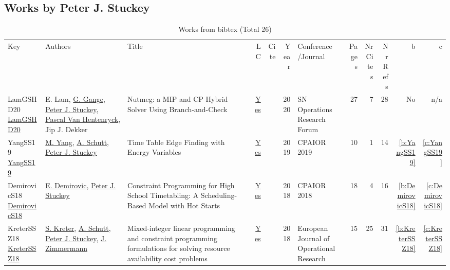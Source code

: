 \subsection{Works by Peter J. Stuckey}
\label{sec:a126}
{\scriptsize
\begin{longtable}{>{\raggedright\arraybackslash}p{3cm}>{\raggedright\arraybackslash}p{6cm}>{\raggedright\arraybackslash}p{6.5cm}rrrp{2.5cm}rrrrr}
\rowcolor{white}\caption{Works from bibtex (Total 26)}\\ \toprule
\rowcolor{white}Key & Authors & Title & LC & Cite & Year & \shortstack{Conference\\/Journal} & Pages & \shortstack{Nr\\Cites} & \shortstack{Nr\\Refs} & b & c \\ \midrule\endhead
\bottomrule
\endfoot
LamGSHD20 \href{http://dx.doi.org/10.1007/s43069-020-00023-2}{LamGSHD20} & E. Lam, \hyperref[auth:a187]{G. Gange}, \hyperref[auth:a126]{Peter J. Stuckey}, \hyperref[auth:a149]{Pascal Van Hentenryck}, Jip J. Dekker & Nutmeg: a MIP and CP Hybrid Solver Using Branch-and-Check & \href{works/LamGSHD20.pdf}{Yes} & \cite{LamGSHD20} & 2020 & SN Operations Research Forum & 27 & 7 & 28 & No & n/a\\
YangSS19 \href{https://doi.org/10.1007/978-3-030-19212-9\_42}{YangSS19} & \hyperref[auth:a312]{M. Yang}, \hyperref[auth:a125]{A. Schutt}, \hyperref[auth:a126]{Peter J. Stuckey} & Time Table Edge Finding with Energy Variables & \href{works/YangSS19.pdf}{Yes} & \cite{YangSS19} & 2019 & CPAIOR 2019 & 10 & 1 & 14 & \ref{b:YangSS19} & \ref{c:YangSS19}\\
DemirovicS18 \href{https://doi.org/10.1007/978-3-319-93031-2\_10}{DemirovicS18} & \hyperref[auth:a315]{E. Demirovic}, \hyperref[auth:a126]{Peter J. Stuckey} & Constraint Programming for High School Timetabling: {A} Scheduling-Based Model with Hot Starts & \href{works/DemirovicS18.pdf}{Yes} & \cite{DemirovicS18} & 2018 & CPAIOR 2018 & 18 & 4 & 16 & \ref{b:DemirovicS18} & \ref{c:DemirovicS18}\\
KreterSSZ18 \href{https://doi.org/10.1016/j.ejor.2017.10.014}{KreterSSZ18} & \hyperref[auth:a124]{S. Kreter}, \hyperref[auth:a125]{A. Schutt}, \hyperref[auth:a126]{Peter J. Stuckey}, \hyperref[auth:a804]{J. Zimmermann} & Mixed-integer linear programming and constraint programming formulations for solving resource availability cost problems & \href{works/KreterSSZ18.pdf}{Yes} & \cite{KreterSSZ18} & 2018 & European Journal of Operational Research & 15 & 25 & 31 & \ref{b:KreterSSZ18} & \ref{c:KreterSSZ18}\\

\end{longtable}}
